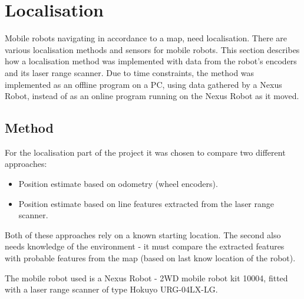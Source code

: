 \section{Localisation}
Mobile robots navigating in accordance to a map, need localisation.
There are various localisation methods and sensors for mobile robots.
This section describes how a localisation method was implemented %
with data from the robot's encoders and its laser range scanner.
Due to time constraints, the method was implemented as an offline program
on a PC, using data gathered by a Nexus Robot, instead of as an online program
running on the Nexus Robot as it moved.
\subsection{Method}
For the localisation part of the project it was chosen to compare two different approaches:

\begin{itemize}
	\item Position estimate based on odometry (wheel encoders).
	\item Position estimate based on line features extracted from the laser range scanner. 
\end{itemize}

Both of these approaches rely on a known starting location.
The second also needs knowledge of the environment
 - it must  compare the extracted features with probable features from the map
(based on last know location of the robot). 


The mobile robot used is a Nexus Robot - 2WD mobile robot kit 10004,
fitted with a laser range scanner of type Hokuyo URG-04LX-LG. 

